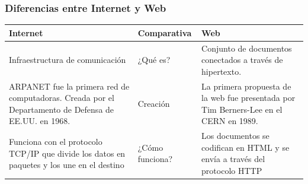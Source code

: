 \documentclass[
10pt, %
aspectratio=169, %
]{beamer}
\begin{document}
	\begin{frame}[fragile]
		
		\frametitle{Diferencias entre Internet y Web}
		
		\begin{centering}
			
			\begin{tabular}{|p{5.2cm}|p{2.6cm}|p{5.2cm}|}
				\hline
				
				\rowcolor{lightgray}
				\textbf{Internet} & \textbf{Comparativa} & \textbf{Web} \\ \hline
				\hline
				
				Infraestructura de comunicación 
				& \cellcolor{lightgray} ¿Qué es? 
				& Conjunto de documentos conectados a través de hipertexto. \\ 
				\hline
				
				ARPANET fue la primera red de computadoras. Creada por el Departamento de Defensa de EE.UU. en 1968.
				& \cellcolor{lightgray} Creación
				& La primera propuesta de la web fue presentada por Tim Berners-Lee en el CERN en 1989. \\ 
				\hline
				
				Funciona con el protocolo TCP/IP que divide los datos en paquetes y los une en el destino 
				& \cellcolor{lightgray} ¿Cómo funciona? 
				& Los documentos se codifican en HTML y se envía a través del protocolo HTTP \\ 
				\hline
								
			\end{tabular}
	
		\end{centering}
		
	\end{frame}
	
\end{document}
